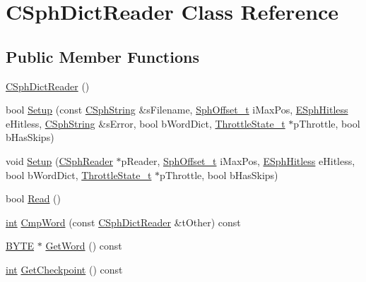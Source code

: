 \hypertarget{classCSphDictReader}{\section{C\-Sph\-Dict\-Reader Class Reference}
\label{classCSphDictReader}
}
\subsection*{Public Member Functions}
\begin{DoxyCompactItemize}
\item 
\hyperlink{classCSphDictReader_a4d6968d5a10941c4050b09bc593fb529}{C\-Sph\-Dict\-Reader} ()
\item 
bool \hyperlink{classCSphDictReader_af6017020471c29139580f331b4996800}{Setup} (const \hyperlink{structCSphString}{C\-Sph\-String} \&s\-Filename, \hyperlink{sphinx_8h_a0fb3b64afebef33c61367714754eaa90}{Sph\-Offset\-\_\-t} i\-Max\-Pos, \hyperlink{sphinx_8h_a1920852c5151009d65cf2bc8204a685b}{E\-Sph\-Hitless} e\-Hitless, \hyperlink{structCSphString}{C\-Sph\-String} \&s\-Error, bool b\-Word\-Dict, \hyperlink{structThrottleState__t}{Throttle\-State\-\_\-t} $\ast$p\-Throttle, bool b\-Has\-Skips)
\item 
void \hyperlink{classCSphDictReader_abd30c1e8e424f14cef65dba4d9fd9edb}{Setup} (\hyperlink{classCSphReader}{C\-Sph\-Reader} $\ast$p\-Reader, \hyperlink{sphinx_8h_a0fb3b64afebef33c61367714754eaa90}{Sph\-Offset\-\_\-t} i\-Max\-Pos, \hyperlink{sphinx_8h_a1920852c5151009d65cf2bc8204a685b}{E\-Sph\-Hitless} e\-Hitless, bool b\-Word\-Dict, \hyperlink{structThrottleState__t}{Throttle\-State\-\_\-t} $\ast$p\-Throttle, bool b\-Has\-Skips)
\item 
bool \hyperlink{classCSphDictReader_a911ff89600ee84d30c74ccfbdabc1f0f}{Read} ()
\item 
\hyperlink{sphinxexpr_8cpp_a4a26e8f9cb8b736e0c4cbf4d16de985e}{int} \hyperlink{classCSphDictReader_ac040da5e652a2fe5622febf76908f564}{Cmp\-Word} (const \hyperlink{classCSphDictReader}{C\-Sph\-Dict\-Reader} \&t\-Other) const 
\item 
\hyperlink{sphinxstd_8h_a4ae1dab0fb4b072a66584546209e7d58}{B\-Y\-T\-E} $\ast$ \hyperlink{classCSphDictReader_af8e16d6d6d17302d3058c7aa5f3a0f07}{Get\-Word} () const 
\item 
\hyperlink{sphinxexpr_8cpp_a4a26e8f9cb8b736e0c4cbf4d16de985e}{int} \hyperlink{classCSphDictReader_a74db979b812a2ee90f5dc2b9a04a0507}{Get\-Checkpoint} () const 
\end{DoxyCompactItemize}

